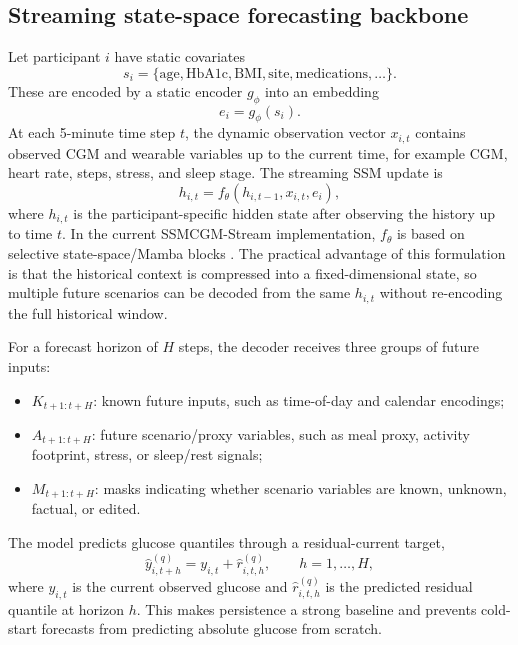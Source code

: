 \subsection{Streaming state-space forecasting backbone}
\label{subsec:cf_backbone}

Let participant $i$ have static covariates
\begin{equation}
    s_i = \{\mathrm{age}, \mathrm{HbA1c}, \mathrm{BMI}, \mathrm{site}, \mathrm{medications}, \ldots\}.
\end{equation}
These are encoded by a static encoder $g_\phi$ into an embedding
\begin{equation}
    e_i = g_\phi(s_i).
\end{equation}
At each 5-minute time step $t$, the dynamic observation vector $x_{i,t}$ contains observed CGM and wearable variables up to the current time, for example CGM, heart rate, steps, stress, and sleep stage. The streaming SSM update is
\begin{equation}
    h_{i,t} = f_\theta(h_{i,t-1}, x_{i,t}, e_i),
    \label{eq:stream_update}
\end{equation}
where $h_{i,t}$ is the participant-specific hidden state after observing the history up to time $t$. In the current SSMCGM-Stream implementation, $f_\theta$ is based on selective state-space/Mamba blocks \citep{gu2023mamba,dao2024transformers}. The practical advantage of this formulation is that the historical context is compressed into a fixed-dimensional state, so multiple future scenarios can be decoded from the same $h_{i,t}$ without re-encoding the full historical window.

For a forecast horizon of $H$ steps, the decoder receives three groups of future inputs:
\begin{itemize}
    \item $K_{t+1:t+H}$: known future inputs, such as time-of-day and calendar encodings;
    \item $A_{t+1:t+H}$: future scenario/proxy variables, such as meal proxy, activity footprint, stress, or sleep/rest signals;
    \item $M_{t+1:t+H}$: masks indicating whether scenario variables are known, unknown, factual, or edited.
\end{itemize}
The model predicts glucose quantiles through a residual-current target,
\begin{equation}
    \hat{y}^{(q)}_{i,t+h} = y_{i,t} + \hat{r}^{(q)}_{i,t,h}, \qquad h=1,\ldots,H,
    \label{eq:residual_current}
\end{equation}
where $y_{i,t}$ is the current observed glucose and $\hat{r}^{(q)}_{i,t,h}$ is the predicted residual quantile at horizon $h$. This makes persistence a strong baseline and prevents cold-start forecasts from predicting absolute glucose from scratch.

